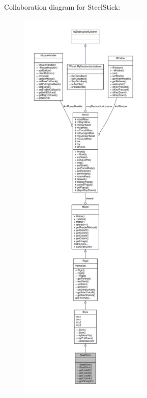 Collaboration diagram for Steel\+Stick\+:\nopagebreak
\begin{figure}[H]
\begin{center}
\leavevmode
\includegraphics[height=550pt]{classSteelStick__coll__graph}
\end{center}
\end{figure}
